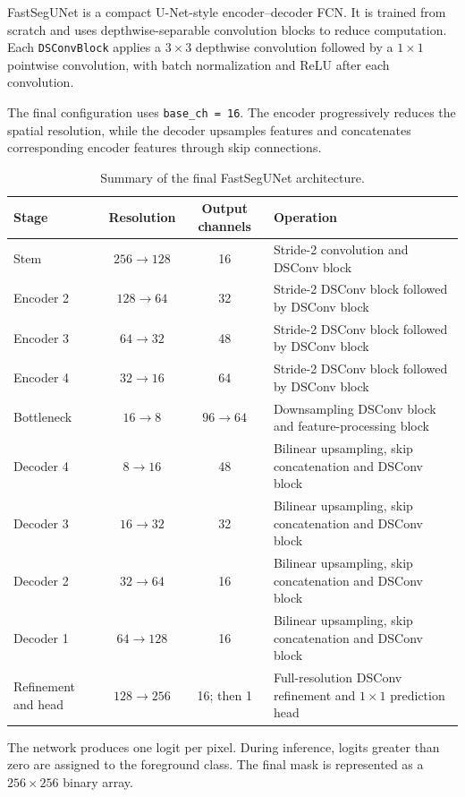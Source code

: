 \documentclass[10pt,a4paper]{article}
\newcommand{\code}[1]{\texttt{\small #1}}
\begin{document}
FastSegUNet is a compact U-Net-style encoder--decoder FCN. It is trained from scratch and uses depthwise-separable convolution blocks to reduce computation. Each \code{DSConvBlock} applies a $3\times3$ depthwise convolution followed by a $1\times1$ pointwise convolution, with batch normalization and ReLU after each convolution.

The final configuration uses \code{base\_ch = 16}. The encoder progressively reduces the spatial resolution, while the decoder upsamples features and concatenates corresponding encoder features through skip connections.

\begin{table}[H]
\centering
\small
\caption{Summary of the final FastSegUNet architecture.}
\begin{tabularx}{\linewidth}{@{}l c c X@{}}
\toprule
\textbf{Stage} & \textbf{Resolution} & \textbf{Output channels} & \textbf{Operation}\\
\midrule
Stem & $256\to128$ & 16 & Stride-2 convolution and DSConv block\\
Encoder 2 & $128\to64$ & 32 & Stride-2 DSConv block followed by DSConv block\\
Encoder 3 & $64\to32$ & 48 & Stride-2 DSConv block followed by DSConv block\\
Encoder 4 & $32\to16$ & 64 & Stride-2 DSConv block followed by DSConv block\\
Bottleneck & $16\to8$ & $96\to64$ & Downsampling DSConv block and feature-processing block\\
Decoder 4 & $8\to16$ & 48 & Bilinear upsampling, skip concatenation and DSConv block\\
Decoder 3 & $16\to32$ & 32 & Bilinear upsampling, skip concatenation and DSConv block\\
Decoder 2 & $32\to64$ & 16 & Bilinear upsampling, skip concatenation and DSConv block\\
Decoder 1 & $64\to128$ & 16 & Bilinear upsampling, skip concatenation and DSConv block\\
Refinement and head & $128\to256$ & 16; then 1 & Full-resolution DSConv refinement and $1\times1$ prediction head\\
\bottomrule
\end{tabularx}
\end{table}

The network produces one logit per pixel. During inference, logits greater than zero are assigned to the foreground class. The final mask is represented as a $256\times256$ binary array.
\end{document}
